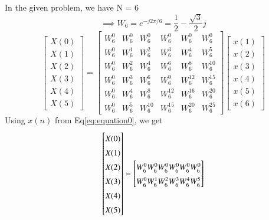 \documentclass[journal,12pt,twocolumn]{IEEEtran}
\renewcommand\thesection{\arabic{section}}
\begin{document}
\begin{enumerate}[label=\thesection.\arabic*.,ref=\thesection.\theenumi]
In the given problem, we have N = 6
\begin{equation}
\implies W_{6} = e^{-j2\pi/6} = \frac{1}{2}-\frac{\sqrt{3}}{2}j 
\end{equation}
\begin{equation}
\begin{bmatrix} 
X(0) \\ 
X(1) \\ 
X(2) \\ 
X(3) \\ 
X(4) \\ 
X(5) 
\end{bmatrix}
=
\begin{bmatrix}
W^{0}_{6} & W^{0}_{6} & W^{0}_{6} & W^{0}_{6} & W^{0}_{6} & W^{0}_{6}\\
W^{0}_{6} & W^{1}_{6} & W^{2}_{6} & W^{3}_{6} & W^{4}_{6} & W^{5}_{6}\\
W^{0}_{6} & W^{2}_{6} & W^{4}_{6} & W^{6}_{6} & W^{8}_{6} & W^{10}_{6}\\
W^{0}_{6} & W^{3}_{6} & W^{6}_{6} & W^{9}_{6} & W^{12}_{6} & W^{15}_{6}\\
W^{0}_{6} & W^{4}_{6} & W^{8}_{6} & W^{12}_{6} & W^{16}_{6} & W^{20}_{6}\\
W^{0}_{6} & W^{5}_{6} & W^{10}_{6} & W^{15}_{6} & W^{20}_{6} & W^{25}_{6} 
\end{bmatrix}
\begin{bmatrix}
x(1) \\ 
x(2) \\ 
x(3) \\ 
x(4) \\ 
x(5) \\ 
x(6)
\end{bmatrix}
\end{equation}
\newline
Using $x(n)$ from Eq\eqref{eq:equation0}, we get
\begin{equation}
\renewcommand{\arraystretch}{1.45}
\setlength\arraycolsep{0.01pt}
\begin{bmatrix} 
X(0) \\ X(1) \\ X(2) \\ X(3) \\ X(4) \\ X(5) 
\end{bmatrix}
=
\begin{bmatrix}
W^{0}_{6} & W^{0}_{6} & W^{0}_{6} & W^{0}_{6} & W^{0}_{6} & W^{0}_{6}\\
W^{0}_{6} & W^{1}_{6} & W^{2}_{6} & W^{3}_{6} & W^{4}_{6} & W^{5}_{6}\\

\end{bmatrix}
\end{equation}
\end{enumerate}
\end{document}
